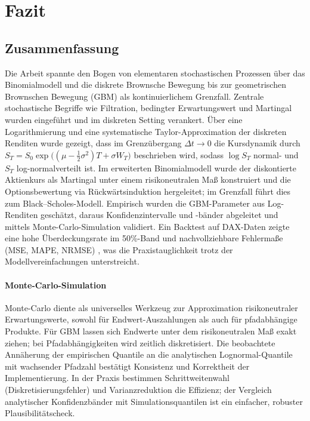 \section{Fazit}

\subsection{Zusammenfassung}

Die Arbeit spannte den Bogen von elementaren stochastischen Prozessen über das Binomialmodell und die diskrete Brownsche 
Bewegung bis zur geometrischen Brownschen Bewegung (GBM) als kontinuierlichem Grenzfall. Zentrale stochastische Begriffe wie 
Filtration, bedingter Erwartungswert und Martingal wurden eingeführt und im diskreten Setting verankert. Über eine 
Logarithmierung und eine systematische Taylor-Approximation der diskreten Renditen wurde gezeigt, dass im Grenzübergang 
$\Delta t \to 0$ die Kursdynamik durch
$S_T = S_0 \exp\!\big((\mu - \tfrac12\sigma^2)T + \sigma W_T\big)$
beschrieben wird, sodass $\log S_T$ normal- und $S_T$ log-normalverteilt ist. Im erweiterten Binomialmodell 
wurde der diskontierte Aktienkurs als Martingal unter einem risikoneutralen Maß konstruiert und die Optionsbewertung 
via Rückwärtsinduktion hergeleitet; im Grenzfall führt dies zum Black–Scholes-Modell. Empirisch wurden die GBM-Parameter aus 
Log-Renditen geschätzt, daraus Konfidenzintervalle und -bänder abgeleitet und mittels Monte-Carlo-Simulation validiert. 
Ein Backtest auf DAX-Daten zeigte eine hohe Überdeckungsrate im 50\%-Band und nachvollziehbare Fehlermaße (MSE, MAPE, NRMSE) \cite{botchkarev_performance_2019}, 
was die Praxistauglichkeit trotz der Modellvereinfachungen unterstreicht.

\paragraph{Monte-Carlo-Simulation}
Monte-Carlo diente als universelles Werkzeug zur Approximation risikoneutraler 
Erwartungswerte, sowohl für Endwert-Auszahlungen als auch für pfadabhängige Produkte. 
Für GBM lassen sich Endwerte unter dem risikoneutralen Maß exakt ziehen; bei Pfadabhängigkeiten 
wird zeitlich diskretisiert. Die beobachtete Annäherung der empirischen Quantile an die 
analytischen Lognormal-Quantile mit wachsender Pfadzahl bestätigt Konsistenz und Korrektheit 
der Implementierung. In der Praxis bestimmen Schrittweitenwahl (Diskretisierungsfehler) und 
Varianzreduktion die Effizienz; der Vergleich analytischer Konfidenzbänder mit 
Simulationsquantilen ist ein einfacher, robuster Plausibilitätscheck.

